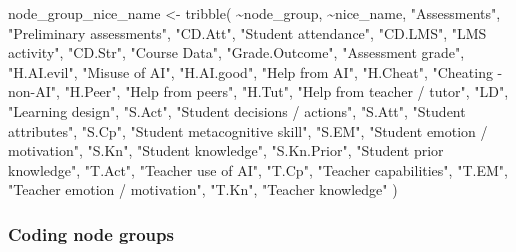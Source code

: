 \documentclass[
  letterpaper,
  DIV=11,
  numbers=noendperiod]{scrartcl}
\newenvironment{Shaded}{\begin{snugshade}}{\end{snugshade}}
\newcommand{\FunctionTok}[1]{\textcolor[rgb]{0.28,0.35,0.67}{#1}}
\newcommand{\NormalTok}[1]{\textcolor[rgb]{0.00,0.23,0.31}{#1}}
\newcommand{\OtherTok}[1]{\textcolor[rgb]{0.00,0.23,0.31}{#1}}
\newcommand{\SpecialCharTok}[1]{\textcolor[rgb]{0.37,0.37,0.37}{#1}}
\newcommand{\StringTok}[1]{\textcolor[rgb]{0.13,0.47,0.30}{#1}}
\begin{document}
\begin{Shaded}
\begin{Highlighting}[]
\NormalTok{node\_group\_nice\_name }\OtherTok{\textless{}{-}} \FunctionTok{tribble}\NormalTok{(}
    \SpecialCharTok{\textasciitilde{}}\NormalTok{node\_group, }\SpecialCharTok{\textasciitilde{}}\NormalTok{nice\_name,}
    \StringTok{"Assessments"}\NormalTok{, }\StringTok{"Preliminary assessments"}\NormalTok{, }
    \StringTok{"CD.Att"}\NormalTok{, }\StringTok{"Student attendance"}\NormalTok{,}
    \StringTok{"CD.LMS"}\NormalTok{, }\StringTok{"LMS activity"}\NormalTok{,}
    \StringTok{"CD.Str"}\NormalTok{, }\StringTok{"Course Data"}\NormalTok{,}
    \StringTok{"Grade.Outcome"}\NormalTok{, }\StringTok{"Assessment grade"}\NormalTok{,}
    \StringTok{"H.AI.evil"}\NormalTok{, }\StringTok{"Misuse of AI"}\NormalTok{,}
    \StringTok{"H.AI.good"}\NormalTok{, }\StringTok{"Help from AI"}\NormalTok{,}
    \StringTok{"H.Cheat"}\NormalTok{, }\StringTok{"Cheating {-} non{-}AI"}\NormalTok{,}
    \StringTok{"H.Peer"}\NormalTok{, }\StringTok{"Help from peers"}\NormalTok{,}
    \StringTok{"H.Tut"}\NormalTok{, }\StringTok{"Help from teacher / tutor"}\NormalTok{,}
    \StringTok{"LD"}\NormalTok{, }\StringTok{"Learning design"}\NormalTok{,}
    \StringTok{"S.Act"}\NormalTok{, }\StringTok{"Student decisions / actions"}\NormalTok{,}
    \StringTok{"S.Att"}\NormalTok{, }\StringTok{"Student attributes"}\NormalTok{,}
    \StringTok{"S.Cp"}\NormalTok{, }\StringTok{"Student metacognitive skill"}\NormalTok{,}
    \StringTok{"S.EM"}\NormalTok{, }\StringTok{"Student emotion / motivation"}\NormalTok{,}
    \StringTok{"S.Kn"}\NormalTok{, }\StringTok{"Student knowledge"}\NormalTok{,}
    \StringTok{"S.Kn.Prior"}\NormalTok{, }\StringTok{"Student prior knowledge"}\NormalTok{,}
    \StringTok{"T.Act"}\NormalTok{, }\StringTok{"Teacher use of AI"}\NormalTok{,}
    \StringTok{"T.Cp"}\NormalTok{, }\StringTok{"Teacher capabilities"}\NormalTok{, }
    \StringTok{"T.EM"}\NormalTok{, }\StringTok{"Teacher emotion / motivation"}\NormalTok{,}
    \StringTok{"T.Kn"}\NormalTok{, }\StringTok{"Teacher knowledge"}
\NormalTok{)}
\end{Highlighting}
\end{Shaded}

\subsubsection{Coding node groups}\label{coding-node-groups}
\end{document}
